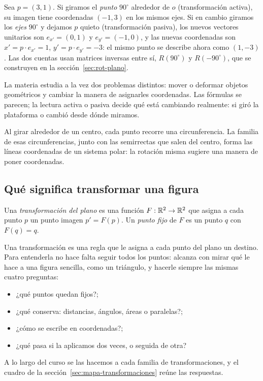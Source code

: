 \begin{ejemplo}
Sea \(p=(3,1)\). Si giramos el \emph{punto} \(90^\circ\) alrededor de \(o\) (transformación
activa), su imagen tiene coordenadas \((-1,3)\) en los mismos ejes. Si en cambio giramos los
\emph{ejes} \(90^\circ\) y dejamos \(p\) quieto (transformación pasiva), los nuevos vectores
unitarios son \(e_{x'}=(0,1)\) y \(e_{y'}=(-1,0)\), y las nuevas coordenadas son
\(x'=p\cdot e_{x'}=1\), \(y'=p\cdot e_{y'}=-3\): el mismo punto se describe ahora como
\((1,-3)\). Las dos cuentas usan matrices inversas entre sí, \(R(90^\circ)\) y \(R(-90^\circ)\),
que se construyen en la sección~\ref{sec:rot-plano}.
\end{ejemplo}

\begin{idea}
La materia estudia a la vez dos problemas distintos: mover o deformar objetos geométricos y
cambiar la manera de asignarles coordenadas. Las fórmulas se parecen; la lectura activa o
pasiva decide qué está cambiando realmente: si giró la plataforma o cambió desde dónde
miramos.
\end{idea}

\begin{idea}
Al girar alrededor de un centro, cada punto recorre una circunferencia. La familia de esas
circunferencias, junto con las semirrectas que salen del centro, forma las líneas coordenadas
de un sistema polar: la rotación misma sugiere una manera de poner coordenadas.
\end{idea}

\subsection{Qué significa transformar una figura}\label{sec:transformar}

\begin{definicion}
Una \emph{transformación del plano} es una función \(F:\mathbb{R}^2\to\mathbb{R}^2\) que asigna a cada punto
\(p\) un punto imagen \(p'=F(p)\). Un \emph{punto fijo} de \(F\) es un punto \(q\) con
\(F(q)=q\).
\end{definicion}

Una transformación es una regla que le asigna a cada punto del plano un destino. Para
entenderla no hace falta seguir todos los puntos: alcanza con mirar qué le hace a una figura
sencilla, como un triángulo, y hacerle siempre las mismas cuatro preguntas:
\begin{itemize}
  \item ¿qué puntos quedan fijos?;
  \item ¿qué conserva: distancias, ángulos, áreas o paralelas?;
  \item ¿cómo se escribe en coordenadas?;
  \item ¿qué pasa si la aplicamos dos veces, o seguida de otra?
\end{itemize}
A lo largo del curso se las hacemos a cada familia de transformaciones, y el cuadro de la sección~\ref{sec:mapa-transformaciones} reúne las
respuestas.

